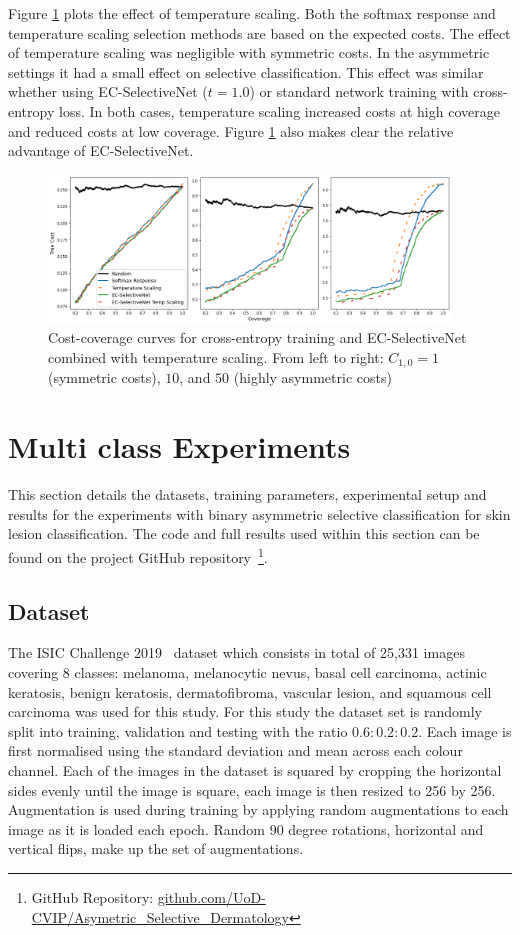 Figure \ref{fig:temp_scaling} plots the effect of temperature scaling. Both the softmax response and temperature scaling selection methods are based on the expected costs. The effect of temperature scaling was negligible with symmetric costs. In the asymmetric settings it had a small effect on selective classification. This effect was similar whether using EC-SelectiveNet ($t=1.0$) or standard network training with cross-entropy loss. In both cases, temperature scaling increased costs at high coverage and reduced costs at low coverage. Figure \ref{fig:temp_scaling} also makes clear the relative advantage of EC-SelectiveNet.

\begin{figure}[h]
	\centering
	\includegraphics[width=0.95\textwidth]{images/tmp_scaling_v2.png}
	\caption{Cost-coverage curves for cross-entropy training and EC-SelectiveNet combined with temperature scaling. From left to right: $C_{1,0}=1$ (symmetric costs), $10$, and $50$ (highly asymmetric costs)}
	\label{fig:temp_scaling}
\end{figure}

\section{Multi class Experiments}
\label{sec:selective_multi_class_experiments}
This section details the datasets, training parameters, experimental setup and results for the experiments with binary asymmetric selective classification for skin lesion classification. The code and full results used within this section can be found on the project GitHub repository~\footnote{GitHub Repository: \url{github.com/UoD-CVIP/Asymetric_Selective_Dermatology}}.

\subsection{Dataset}
The ISIC Challenge 2019~\citep{codella2018skin,combalia2019csn20000,tschandl2018ham10000} dataset which consists in total of 25,331 images covering 8 classes: melanoma, melanocytic nevus, basal cell carcinoma, actinic keratosis, benign keratosis, dermatofibroma, vascular lesion, and squamous cell carcinoma was used for this study. For this study the dataset set is randomly split into training, validation and testing with the ratio $0.6:0.2:0.2$. Each image is first normalised using the standard deviation and mean across each colour channel. Each of the images in the dataset is squared by cropping the horizontal sides evenly until the image is square, each image is then resized to 256 by 256. Augmentation is used during training by applying random augmentations to each image as it is loaded each epoch. Random 90 degree rotations, horizontal and vertical flips, make up the set of augmentations.


